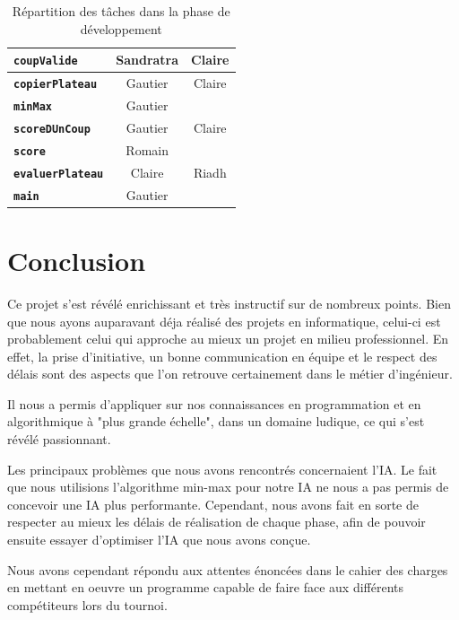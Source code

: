 \documentclass[11pt]{report}
\begin{document}
\begin{table}[h]
\begin{center}
\begin{tabular}{c|c|c|}
 \multicolumn{1}{|l|}{ \textbf{\texttt{coupValide}}} & Sandratra & Claire\\ \hline
  \multicolumn{1}{|l|}{\textbf{\texttt{copierPlateau}}} & Gautier & Claire \\ \hline
  \multicolumn{1}{|l|}{\textbf{\texttt{minMax}}} & Gautier & \cellcolor{lightgray} \\ \hline
  \multicolumn{1}{|l|}{\textbf{\texttt{scoreDUnCoup}}} & Gautier & Claire \\ \hline
  \multicolumn{1}{|l|}{\textbf{\texttt{score}}} & Romain &   \cellcolor{lightgray}  \\ \hline
 \multicolumn{1}{|l|}{ \textbf{\texttt{evaluerPlateau}}} & Claire &  Riadh \\ \hline
 \multicolumn{1}{|l|}{ \textbf{\texttt{main}}} & Gautier & \cellcolor{lightgray} \\ \hline
\end{tabular}
\end{center}
\caption{Répartition des tâches dans la phase de développement}
\end{table}
\thispagestyle{plain}
\chapter*{Conclusion}
	Ce projet s'est révélé enrichissant et très instructif sur de nombreux points. Bien que nous ayons auparavant déja réalisé des projets en informatique, celui-ci est probablement celui qui approche au mieux un projet en milieu professionnel. En effet, la prise d'initiative, un bonne communication en équipe et le respect des délais sont des aspects que l'on retrouve certainement dans le métier d'ingénieur.

	Il nous a permis d'appliquer sur nos connaissances en programmation et en algorithmique à "plus grande échelle", dans un domaine ludique, ce qui s'est révélé passionnant.

	Les principaux problèmes que nous avons rencontrés concernaient l'IA. Le fait que nous utilisions l'algorithme min-max pour notre IA ne nous a pas permis de concevoir une IA plus performante. Cependant, nous avons fait en sorte de respecter au mieux les délais de réalisation de chaque phase, afin de pouvoir ensuite essayer d'optimiser l'IA que nous avons conçue. 

	Nous avons cependant répondu aux attentes énoncées dans le cahier des charges en mettant en oeuvre un programme capable de faire face aux différents compétiteurs lors du tournoi. 
\end{document}
